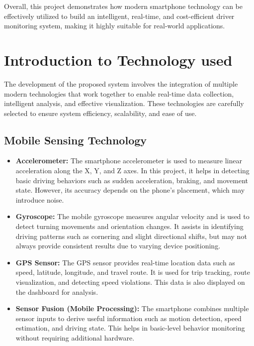 Overall, this project demonstrates how modern smartphone technology can be effectively utilized to build an intelligent, real-time, and cost-efficient driver monitoring system, making it highly suitable for real-world applications.

\section{Introduction to Technology used}
\label{sec:tech_used}
The development of the proposed system involves the integration of multiple modern technologies that work together to enable real-time data collection, intelligent analysis, and effective visualization. These technologies are carefully selected to ensure system efficiency, scalability, and ease of use.

\subsection{Mobile Sensing Technology}
\begin{itemize}
    \item \textbf{Accelerometer:} The smartphone accelerometer is used to measure linear acceleration along the X, Y, and Z axes. In this project, it helps in detecting basic driving behaviors such as sudden acceleration, braking, and movement state. However, its accuracy depends on the phone's placement, which may introduce noise.
    \item \textbf{Gyroscope:} The mobile gyroscope measures angular velocity and is used to detect turning movements and orientation changes. It assists in identifying driving patterns such as cornering and slight directional shifts, but may not always provide consistent results due to varying device positioning.
    \item \textbf{GPS Sensor:} The GPS sensor provides real-time location data such as speed, latitude, longitude, and travel route. It is used for trip tracking, route visualization, and detecting speed violations. This data is also displayed on the dashboard for analysis.
    \item \textbf{Sensor Fusion (Mobile Processing):} The smartphone combines multiple sensor inputs to derive useful information such as motion detection, speed estimation, and driving state. This helps in basic-level behavior monitoring without requiring additional hardware.
\end{itemize}

